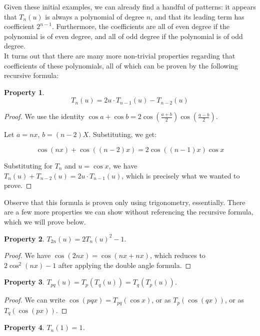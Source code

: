 \documentclass[12pt, letterpaper]{article} %
\newtheorem{theorem}{Property}
\begin{document}
Given these initial examples, we can already find a handful of patterns: it appears that $T_n(u)$ is always a polynomial of degree $n$, and that its leading term has coefficient $2^{n-1}$. Furthermore, the coefficients are all of even degree if the polynomial is of even degree, and all of odd degree if the polynomial is of odd degree. \\

It turns out that there are many more non-trivial properties regarding that coefficients of these polynomials, all of which can be proven by the following recursive formula:

\begin{theorem} \[T_n(u) = 2u\cdot T_{n-1}(u) - T_{n-2}(u)\] \end{theorem}

\begin{proof}
We use the identity $\cos a + \cos b = 2\cos(\frac{a+b}{2})\cos(\frac{a-b}{2})$.

Let $a = nx$, $b = (n-2)X$. Substituting, we get:

\[\cos(nx) + \cos((n-2)x) = 2 \cos((n-1)x) \cos x\]

Substituting for $T_n$ and $u = \cos x$, we have $T_{n}(u) + T_{n-2}(u) = 2u\cdot T_{n-1}(u)$, which is precisely what we wanted to prove.
 \end{proof}

Observe that this formula is proven only using trigonometry, essentially. There are a few more properties we can show without referencing the recursive formula, which we will prove below.

\begin{theorem} $T_{2n}(u) = 2T_{n}(u)^2 - 1.$ \end{theorem}

\begin{proof} We have $\cos{(2nx)} = \cos(nx + nx)$, which reduces to $2\cos^2(nx) - 1$ after applying the double angle formula. \end{proof}

\begin{theorem} $T_{pq}(u) = T_p(T_q(u)) = T_q(T_p(u)).$ \end{theorem}

\begin{proof} We can write $\cos(pqx) = T_{pq}(\cos x)$, or as $T_p(\cos(qx))$, or as $T_q(\cos(px))$. \end{proof}


\begin{theorem}
$T_n(1) = 1$.
\end{theorem}
\end{document}
